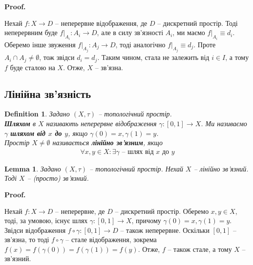 \documentclass[a4paper, 10pt]{article}
\makeatletter
\theoremstyle{theoremdd}
\newtheorem{definition}[theorem]{Definition}
\newtheorem{lemma}[theorem]{Lemma}
\renewenvironment{proof}[1][Proof.\\]{\par
\pushQED{\hfill \qed}%
\normalfont \topsep6\p@\@plus6\p@\relax
\trivlist
\item\relax
{\bfseries
#1\@addpunct{.}}\hspace\labelsep\ignorespaces
}{%
\popQED\endtrivlist\@endpefalse
}
\makeatother
\begin{document}
\begin{proof}
Нехай $f \colon X \to D$ -- неперервне відображення, де $D$ -- дискретний простір. Тоді неперервним буде $f|_{A_i} \colon A_i \to D$, але в силу зв'язності $A_i$, ми маємо $f|_{A_i} \equiv d_i$. Оберемо інше звуження $f|_{A_j} \colon A_j \to D$, тоді аналогічно $f|_{A_j} \equiv d_j$. Проте $A_i \cap A_j \neq \emptyset$, тож звідси $d_i = d_j$. Таким чином, стала не залежить від $i \in I$, а тому $f$ буде сталою на $X$. Отже, $X$ -- зв'язна.
\end{proof}

\subsection{Лінійна зв'язність}
\begin{definition}
Задано $(X,\tau)$ -- топологічний простір.\\
\textbf{Шляхом} в $X$ називають неперервне відображення $\gamma \colon [0,1] \to X$. Ми називаємо $\gamma$ \textbf{шляхом від $x$ до $y$}, якщо $\gamma(0) = x, \gamma(1) = y$.\\
Простір $X \neq \emptyset$ називається \textbf{лінійно зв'язним}, якщо
\begin{align*}
\forall x,y \in X: \exists \gamma \text{ -- шлях від $x$ до $y$}
\end{align*}
\end{definition}

\begin{lemma}
Задано $(X,\tau)$ -- топологічний простір. Нехай $X$ -- лінійно зв'язний. Тоді $X$ -- (просто) зв'язний.
\end{lemma}

\begin{proof}
Нехай $f \colon X \to D$ -- неперервне, де $D$ -- дискретний простір. Оберемо $x,y \in X$, тоді, за умовою, існує шлях $\gamma \colon [0,1] \to X$, причому $\gamma(0) = x, \gamma(1) = y$. Звідси відображення $f \circ \gamma \colon [0,1] \to D$ -- також неперервне. Оскільки $[0,1]$ -- зв'язна, то тоді $f \circ \gamma$ -- стале відображення, зокрема $f(x) = f(\gamma(0)) = f(\gamma(1)) = f(y)$. Отже, $f$ -- також стале, а тому $X$ -- зв'язний.
\end{proof}
\end{document}
